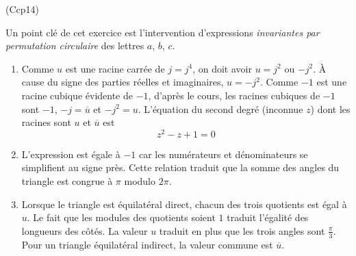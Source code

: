 \begin{tiny}(Ccp14)\end{tiny}
Un point clé de cet exercice est l'intervention d'expressions \emph{invariantes par permutation circulaire} des lettres $a$, $b$, $c$.
\begin{enumerate}
 \item Comme $u$ est une racine carrée de $j=j^4$, on doit avoir $u=j^2$ ou $-j^2$. \`A cause du signe des parties réelles et imaginaires, $u=-j^2$.\newline
Comme $-1$ est une racine cubique évidente de $-1$, d'après le cours, les racines cubiques de $-1$ sont $-1$, $-j=\overline{u}$ et $-j^2=u$. L'équation du second degré (inconnue $z$) dont les racines sont $u$ et $\overline{u}$ est
\begin{displaymath}
 z^2-z+1=0
\end{displaymath}
 
 \item L'expression est égale à $-1$ car les numérateurs et dénominateurs se simplifient au signe près. Cette relation traduit que la somme des angles du triangle est congrue à $\pi$ modulo $2\pi$.

 \item Lorsque le triangle est équilatéral direct, chacun des trois quotients est égal à $u$. Le fait que les modules des quotients soient $1$ traduit l'égalité des longueurs des côtés. La valeur $u$ traduit en plus que les trois angles sont $\frac{\pi}{3}$. Pour un triangle équilatéral indirect, la valeur commune est $\overline{u}$.


\end{enumerate}
